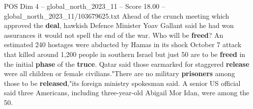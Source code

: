 \begin{textsample}{POS Dim 4 – global\_north\_2023\_11 – Score 18.00 – global\_north\_2023\_11/103679625.txt}
Ahead of the crunch meeting which approved the \textbf{deal}, hawkish Defence Minister Yoav Gallant said he had won assurances it would not spell the end of the war.
Who will be \textbf{freed}?
An estimated 240 hostages were abducted by Hamas in its shock October 7 attack that killed around 1,200 people in southern Israel but just 50 are to be \textbf{freed} in the initial \textbf{phase} of the \textbf{truce}.
Qatar said those earmarked for staggered \textbf{release} were all children or female civilians."There are no military \textbf{prisoners} among those to be \textbf{released},"its foreign ministry spokesman said.
A senior US official said three Americans, including three-year-old Abigail Mor Idan, were among the 50.

\end{textsample}
